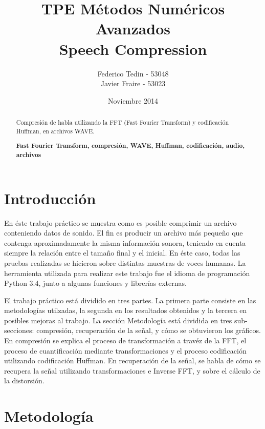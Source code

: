 \documentclass[12pt,a4paper]{article}
\title{TPE Métodos Numéricos Avanzados\\Speech Compression}
\date{Noviembre 2014}
\author{Federico Tedin - 53048\\Javier Fraire - 53023}
\begin{document}
\maketitle

\renewcommand{\abstractname}{Resumen:}
\begin{abstract}

\centering
Compresión de habla utilizando la FFT (Fast Fourier Transform) y codificación Huffman, en archivos WAVE.

\end{abstract}

\renewcommand{\abstractname}{Palabras clave:}
\begin{abstract}

\centering
\textbf{Fast Fourier Transform, compresión, WAVE, Huffman, codificación, audio, archivos}

\end{abstract}

\clearpage
\renewcommand{\contentsname}{Índice}
\tableofcontents
\clearpage

\section{Introducción}

  En éste trabajo práctico se muestra como es posible comprimir un archivo conteniendo datos de sonido. El fin es producir un archivo más pequeño que contenga aproximadamente la misma información sonora, teniendo en cuenta siempre la relación entre el tamaño final y el inicial.  En éste caso, todas las pruebas realizadas se hicieron sobre distintas muestras de voces humanas.  La herramienta utilizada para realizar este trabajo fue el idioma de programación Python 3.4, junto a algunas funciones y librerías externas.

  El trabajo práctico está dividido en tres partes. La primera parte consiste en las metodologías utilzadas, la segunda en los resultados obtenidos y la tercera en posibles mejoras al trabajo. La sección Metodología está dividida en tres sub-secciones: compresión, recuperación de la señal, y cómo se obtuvieron los gráficos. En compresión se explica el proceso de transformación a travéz de la FFT, el proceso de cuantificación mediante transformaciones y el proceso codificación utilizando codificación Huffman. En recuperación de la señal, se habla de cómo se recupera la señal utilizando transformaciones e Inverse FFT, y sobre el cálculo de la distorsión.

\section{Metodología}
\end{document}

